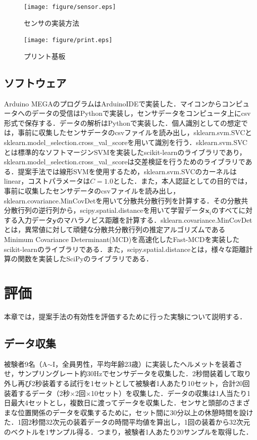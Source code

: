 \documentclass[Japanese,noauthor]{dicomopapers}
\begin{document}
\begin{figure}[!t]
  \begin{center}
    \texttt{[image: figure/sensor.eps]}
  \end{center}
  \caption{センサの実装方法}
  \label{sensor}
\end{figure}

\begin{figure}[!t]
  \begin{center}
    \texttt{[image: figure/print.eps]}
  \end{center}
  \caption{プリント基板}
  \label{print}
\end{figure}

\subsection{ソフトウェア}
Arduino MEGAのプログラムはArduinoIDEで実装した．マイコンからコンピュータへのデータの受信はPythonで実装し，センサデータをコンピュータ上にcsv形式で保存する．データの解析はPythonで実装した．個人識別としての想定では，事前に収集したセンサデータのcsvファイルを読み出し，sklearn.svm.SVCとsklearn.model\_selection.cross\_val\_scoreを用いて識別を行う．sklearn.svm.SVCとは標準的なソフトマージンSVMを実装したscikit-learnのライブラリであり，sklearn.model\_selection.cross\_val\_scoreは交差検証を行うためのライブラリである．提案手法では線形SVMを使用するため，sklearn.svm.SVCのカーネルはlinear，コストパラメータは$C=1.0$とした．また，本人認証としての目的では，事前に収集したセンサデータのcsvファイルを読み出し，sklearn.covariance.MinCovDetを用いて分散共分散行列を計算する．その分散共分散行列の逆行列から，scipy.spatial.distanceを用いて学習データ$\bm{x}_i$のすべてに対する入力データ$\bm{y}$のマハラノビス距離を計算する．sklearn.covariance.MinCovDetとは，異常値に対して頑健な分散共分散行列の推定アルゴリズムであるMinimum Covariance Determinant(MCD)を高速化したFast-MCD\cite{fast_mcd}を実装したscikit-learnのライブラリである．また，scipy.spatial.distanceとは，様々な距離計算の関数を実装したSciPyのライブラリである．

\section{評価}
\label{evaluation}
本章では，提案手法の有効性を評価するために行った実験について説明する．

\subsection{データ収集}
被験者9名（A$\sim$I，全員男性，平均年齢23歳）に実装したヘルメットを装着させ，サンプリングレート約30Hzでセンサデータを収集した．2秒間装着して取り外し再び2秒装着する試行を1セットとして被験者1人あたり10セット，合計20回装着するデータ（2秒$\times$2回$\times$10セット）を収集した．データの収集は1人当たり1日最大4セットとし，複数日に渡ってデータを収集した．センサと頭部のさまざまな位置関係のデータを収集するために，セット間に30分以上の休憩時間を設けた．1回2秒間32次元の装着データの時間平均値を算出し，1回の装着から32次元のベクトルを1サンプル得る．つまり，被験者1人あたり20サンプルを取得した．
\end{document}
